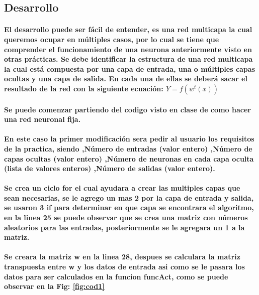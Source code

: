\documentclass[10pt,a4paper]{article}
\begin{document}
\subsection{Desarrollo}

\paragraph{El desarrollo puede ser f\'acil de entender, es una red multicapa la cual queremos ocupar en m\'ultiples casos, por lo cual se tiene que comprender el funcionamiento de una neurona anteriormente visto en otras pr\'acticas.
Se debe identificar la estructura de una red multicapa la cual est\'a compuesta por una capa de entrada, una o m\'ultiples capas ocultas y una capa de salida.
En cada una de ellas se deber\'a sacar el resultado de la red con la siguiente ecuaci\'on:
$Y=f(w^t(x))$
}

\paragraph{Se puede comenzar partiendo del codigo visto en clase de como hacer una red neuronal fija.}

\paragraph{En este caso la primer modificaci\'on sera pedir al usuario los requisitos de la practica, siendo ,N\'umero de entradas (valor entero)
,N\'umero de capas ocultas (valor entero)
,N\'umero de neuronas en cada capa oculta (lista de valores enteros) ,N\'umero de salidas (valor entero).}



\paragraph{Se crea un ciclo for el cual ayudara a crear las multiples capas que sean necesarias, se le agrego un mas 2 por la capa de entrada y salida, se usaron 3 if para determinar en que capa se encontrara el algoritmo, en la linea 25 se puede observar que se crea una matriz con n\'umeros aleatorios para las entradas, posteriormente se le agregara un 1 a la matriz.}
 \paragraph{Se creara la matriz w en la linea 28, despues se calculara la matriz transpuesta entre w y los datos de entrada asi como se le pasara los datos para ser calculados en la funcion funcAct, como se puede observar en la Fig: \ref{fig:cod1}}
\end{document}
